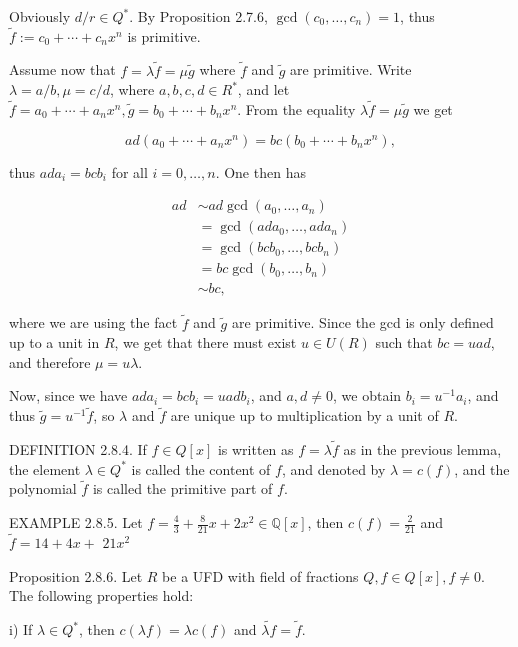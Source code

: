 Obviously $d / r \in Q^{*}$. By Proposition 2.7.6, $\operatorname{gcd}\left(c_{0}, \ldots, c_{n}\right)=1$, thus $\tilde{f}:=c_{0}+\cdots+c_{n} x^{n}$ is primitive.

Assume now that $f=\lambda \tilde{f}=\mu \tilde{g}$ where $\tilde{f}$ and $\tilde{g}$ are primitive. Write $\lambda=a / b, \mu=c / d$, where $a, b, c, d \in R^{*}$, and let $\tilde{f}=a_{0}+\cdots+a_{n} x^{n}, \tilde{g}=b_{0}+\cdots+b_{n} x^{n}$. From the equality $\lambda \tilde{f}=\mu \tilde{g}$ we get

$$
a d\left(a_{0}+\cdots+a_{n} x^{n}\right)=b c\left(b_{0}+\cdots+b_{n} x^{n}\right),
$$

thus $a d a_{i}=b c b_{i}$ for all $i=0, \ldots, n$. One then has

$$
\begin{aligned}
a d & \sim a d \operatorname{gcd}\left(a_{0}, \ldots, a_{n}\right) \\
& =\operatorname{gcd}\left(a d a_{0}, \ldots, a d a_{n}\right) \\
& =\operatorname{gcd}\left(b c b_{0}, \ldots, b c b_{n}\right) \\
& =b c \operatorname{gcd}\left(b_{0}, \ldots, b_{n}\right) \\
& \sim b c,
\end{aligned}
$$

where we are using the fact $\tilde{f}$ and $\tilde{g}$ are primitive. Since the gcd is only defined up to a unit in $R$, we get that there must exist $u \in U(R)$ such that $b c=u a d$, and therefore $\mu=u \lambda$.

Now, since we have $a d a_{i}=b c b_{i}=u a d b_{i}$, and $a, d \neq 0$, we obtain $b_{i}=u^{-1} a_{i}$, and thus $\tilde{g}=u^{-1} \tilde{f}$, so $\lambda$ and $\tilde{f}$ are unique up to multiplication by a unit of $R$.

DEFINITION 2.8.4. If $f \in Q[x]$ is written as $f=\lambda \tilde{f}$ as in the previous lemma, the element $\lambda \in Q^{*}$ is called the content of $f$, and denoted by $\lambda=c(f)$, and the polynomial $\tilde{f}$ is called the primitive part of $f$.

EXAMPLE 2.8.5. Let $f=\frac{4}{3}+\frac{8}{21} x+2 x^{2} \in \mathbb{Q}[x]$, then $c(f)=\frac{2}{21}$ and $\tilde{f}=14+4 x+$ $21 x^{2}$

Proposition 2.8.6. Let $R$ be a UFD with field of fractions $Q, f \in Q[x], f \neq 0$. The following properties hold:

i) If $\lambda \in Q^{*}$, then $c(\lambda f)=\lambda c(f)$ and $\widetilde{\lambda f}=\tilde{f}$.

